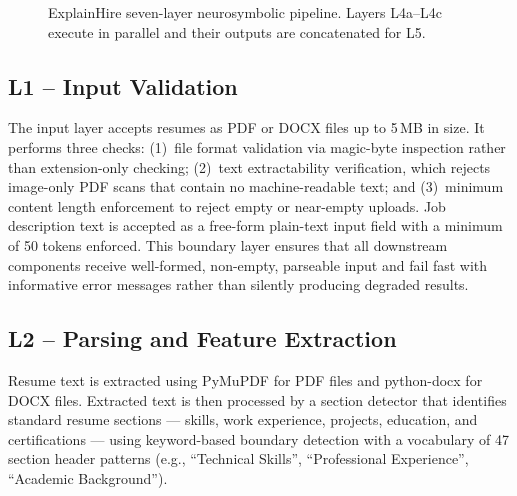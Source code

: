\documentclass[conference]{IEEEtran}
\begin{document}
\begin{figure}[htbp]
\centering
{}
\caption{ExplainHire seven-layer neurosymbolic pipeline. Layers L4a--L4c
execute in parallel and their outputs are concatenated for L5.}
\label{fig:pipeline}
\end{figure}

\subsection{L1 -- Input Validation}
The input layer accepts resumes as PDF or DOCX files up to 5\,MB in size.
It performs three checks: (1)~file format validation via magic-byte inspection
rather than extension-only checking; (2)~text extractability verification,
which rejects image-only PDF scans that contain no machine-readable text;
and (3)~minimum content length enforcement to reject empty or near-empty
uploads. Job description text is accepted as a free-form plain-text input
field with a minimum of 50 tokens enforced. This boundary layer ensures that
all downstream components receive well-formed, non-empty, parseable input
and fail fast with informative error messages rather than silently producing
degraded results.

\subsection{L2 -- Parsing and Feature Extraction}
Resume text is extracted using PyMuPDF for PDF files and python-docx for
DOCX files. Extracted text is then processed by a section detector that
identifies standard resume sections --- skills, work experience, projects,
education, and certifications --- using keyword-based boundary detection
with a vocabulary of 47 section header patterns (e.g., ``Technical Skills'',
``Professional Experience'', ``Academic Background'').
\end{document}
